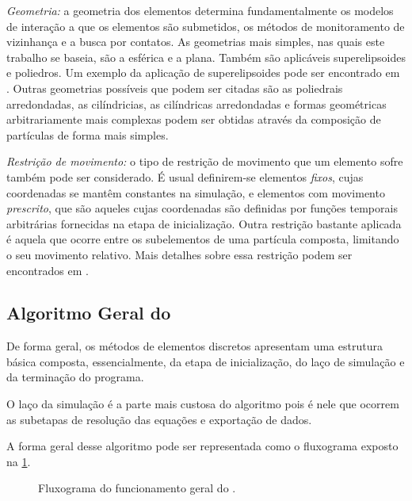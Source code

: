 \begin{alineas}
\item \textit{Geometria:} a geometria dos elementos determina fundamentalmente os modelos de interação a que os elementos são submetidos, os métodos de monitoramento de vizinhança e a busca por contatos. As geometrias mais simples, nas quais este trabalho se baseia, são a esférica e a plana. Também são aplicáveis superelipsoides e poliedros. Um exemplo da aplicação de superelipsoides pode ser encontrado em . Outras geometrias possíveis que podem ser citadas são as poliedrais arredondadas, as cilíndricias, as cilíndricas arredondadas e formas geométricas arbitrariamente mais complexas podem ser obtidas através da composição de partículas de forma mais simples.

\item \textit{Restrição de movimento:} o tipo de restrição de movimento que um elemento sofre também pode ser considerado. É usual definirem-se elementos \textit{fixos}, cujas coordenadas se mantêm constantes na simulação, e elementos com movimento \textit{prescrito}, que são aqueles cujas coordenadas são definidas por funções temporais arbitrárias fornecidas na etapa de inicialização. Outra restrição bastante aplicada é aquela que ocorre entre os subelementos de uma partícula composta, limitando o seu movimento relativo. Mais detalhes sobre essa restrição podem ser encontrados em .
\end{alineas}

\subsection{Algoritmo Geral do \DEM{}} \label{sec:dem_algorithm}

De forma geral, os métodos de elementos discretos apresentam uma estrutura básica composta, essencialmente, da etapa de inicialização, do laço de simulação e da terminação do programa.

O laço da simulação é a parte mais custosa do algoritmo pois é nele que ocorrem as subetapas de resolução das equações e exportação de dados.

A forma geral desse algoritmo pode ser representada como o fluxograma exposto na \cref{fig:general_algorithm}.

\begin{figure}[h]
	\caption{Fluxograma do funcionamento geral do \DEM{}.}
	\centering
		
	\label{fig:general_algorithm}
	\sourceMe
\end{figure}

